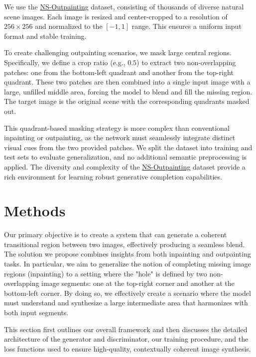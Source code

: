 \documentclass[sigconf]{acmart}
\begin{document}
We use the \textcolor{red}{\href{https://github.com/z-x-yang/NS-Outpainting}{NS-Outpainting}} dataset, consisting of thousands of diverse natural scene images. Each image is resized and center-cropped to a resolution of $256 \times 256$ and normalized to the $[-1,1]$ range. This ensures a uniform input format and stable training.

To create challenging outpainting scenarios, we mask large central regions. Specifically, we define a crop ratio (e.g., $0.5$) to extract two non-overlapping patches: one from the bottom-left quadrant and another from the top-right quadrant. These two patches are then combined into a single input image with a large, unfilled middle area, forcing the model to blend and fill the missing region. The target image is the original scene with the corresponding quadrants masked out.

This quadrant-based masking strategy is more complex than conventional inpainting or outpainting, as the network must seamlessly integrate distinct visual cues from the two provided patches. We split the dataset into training and test sets to evaluate generalization, and no additional semantic preprocessing is applied. The diversity and complexity of the \textcolor{red}{\href{https://github.com/z-x-yang/NS-Outpainting}{NS-Outpainting}} dataset provide a rich environment for learning robust generative completion capabilities.


\section{Methods}

Our primary objective is to create a system that can generate a coherent transitional region between two images, effectively producing a seamless blend. The solution we propose combines insights from both inpainting and outpainting tasks. In particular, we aim to generalize the notion of completing missing image regions (inpainting) to a setting where the "hole" is defined by two non-overlapping image segments: one at the top-right corner and another at the bottom-left corner. By doing so, we effectively create a scenario where the model must understand and synthesize a large intermediate area that harmonizes with both input segments.

This section first outlines our overall framework and then discusses the detailed architecture of the generator and discriminator, our training procedure, and the loss functions used to ensure high-quality, contextually coherent image synthesis.
\end{document}
